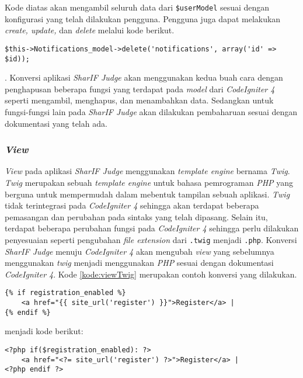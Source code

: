 Kode diatas akan mengambil seluruh data dari \verb|$userModel| sesuai dengan konfigurasi yang telah dilakukan pengguna. Pengguna juga dapat melakukan \textit{create, update,} dan \textit{delete} melalui kode berikut.

\begin{lstlisting}[caption=Contoh kode untuk menghapus data pada model, label=kode:modelCI4Delete]
$this->Notifications_model->delete('notifications', array('id' => $id));

\end{lstlisting}

. Konversi aplikasi \textit{SharIF Judge} akan menggunakan kedua buah cara dengan penghapusan beberapa fungsi yang terdapat pada \textit{model} dari \textit{CodeIgniter 4} seperti mengambil, menghapus, dan menambahkan data. Sedangkan untuk fungsi-fungsi lain pada \textit{SharIF Judge} akan dilakukan pembaharuan sesuai dengan dokumentasi yang telah ada.

\subsubsection{\textit{View}}
\textit{View} pada aplikasi \textit{SharIF Judge} menggunakan \textit{template engine} bernama \textit{Twig}. \textit{Twig} merupakan sebuah \textit{template engine} untuk bahasa pemrograman \textit{PHP} yang berguna untuk mempermudah dalam mebentuk tampilan sebuah aplikasi. \textit{Twig} tidak terintegrasi pada \textit{CodeIgniter 4} sehingga akan terdapat beberapa pemasangan dan perubahan pada sintaks yang telah dipasang. Selain itu, terdapat beberapa perubahan fungsi pada \textit{CodeIgniter 4} sehingga perlu dilakukan penyesuaian seperti pengubahan \textit{file extension} dari \texttt{.twig} menjadi \texttt{.php}. Konversi \textit{SharIF Judge} menuju \textit{CodeIgniter 4} akan mengubah \textit{view} yang sebelumnya menggunakan \textit{twig} menjadi menggunakan \textit{PHP} sesuai dengan dokumentasi \textit{CodeIgniter 4}. Kode \ref{kode:viewTwig} merupakan contoh konversi yang dilakukan.

\begin{lstlisting}[caption=Contoh \textit{view} menggunakan \textit{twig}, label=kode:viewTwig]
{% if registration_enabled %}
	<a href="{{ site_url('register') }}">Register</a> |
{% endif %}
\end{lstlisting}

menjadi kode berikut:

\begin{lstlisting}[caption=Contoh \textit{view} menggunakan \textit{php}, label=kode:viewPHP]
<?php if($registration_enabled): ?>
	<a href="<?= site_url('register') ?>">Register</a> |
<?php endif ?>
\end{lstlisting}


